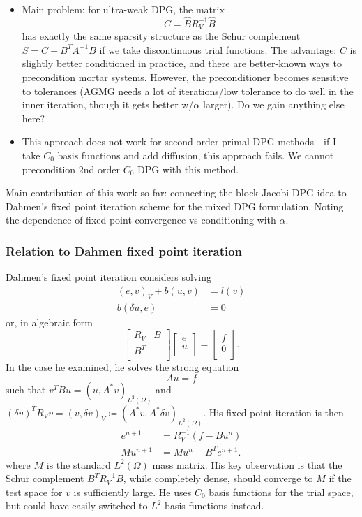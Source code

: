 \documentclass{article}
\newcommand{\LRp}[1]{\left( #1 \right)}
\renewcommand{\L}{L^2\LRp{\Omega}}
\def\arr#1#2#3#4{\left[
\begin{array}{cc}
#1 & #2\\
#3 & #4\\
\end{array}
\right]}
\def\vecttwo#1#2{\left[
\begin{array}{c}
#1\\
#2\\
\end{array}
\right]}
\begin{document}
\begin{itemize}
\item Main problem: for ultra-weak DPG, the matrix 
\[
C = \hat{B}R_V^{-1}\hat{B}
\]
has exactly the same sparsity structure as the Schur complement $S = C - B^TA^{-1}B$ if we take discontinuous trial functions.  The advantage: $C$ is slightly better conditioned in practice, and there are better-known ways to precondition mortar systems.  However, the preconditioner becomes sensitive to tolerances (AGMG needs a lot of iterations/low tolerance to do well in the inner iteration, though it gets better w/$\alpha$ larger).  Do we gain anything else here?  
\item This approach does not work for second order primal DPG methods - if I take $C_0$ basis functions and add diffusion, this approach fails.  We cannot precondition 2nd order $C_0$ DPG with this method.  
\end{itemize}

Main contribution of this work so far: connecting the block Jacobi DPG idea to Dahmen's fixed point iteration scheme for the mixed DPG formulation.  Noting the dependence of fixed point convergence vs conditioning with $\alpha$.  

\subsubsection{Relation to Dahmen fixed point iteration}

Dahmen's fixed point iteration considers solving
\begin{align*}
(e,v)_V + b(u,v) &= l(v) \\
b(\delta u,e) &= 0
\end{align*}
or, in algebraic form
\[
\arr{R_V}{B}{B^T}{}\vecttwo{e}{u} = \vecttwo{f}{0}.
\]
In the case he examined, he solves the strong equation 
\[
Au = f
\]
such that $v^TBu = (u,A^*v)_{\L}$ and $(\delta v)^TR_Vv = (v,\delta v)_V \coloneqq (A^*v,A^*\delta v)_{\L}$.  His fixed point iteration is then
\begin{align*}
e^{n+1} &= R_V^{-1}(f - Bu^n) \\
Mu^{n+1} &= Mu^n + B^Te^{n+1}.
\end{align*}
where $M$ is the standard $\L$ mass matrix.  His key observation is that the Schur complement $B^TR_V^{-1}B$, while completely dense, should converge to $M$ if the test space for $v$ is sufficiently large.  He uses $C_0$ basis functions for the trial space, but could have easily switched to $L^2$ basis functions instead.  
\end{document}
